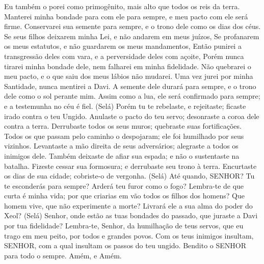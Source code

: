 {  Eu também o porei como primogênito, mais alto que todos os reis da terra.
  Manterei minha bondade para com ele para sempre, e meu pacto com ele será firme.
  Conservarei sua semente para sempre, e o trono dele como os dias dos céus.
  Se seus filhos deixarem minha Lei, e não andarem em meus juízos,
  Se profanarem os meus estatutos, e não guardarem os meus mandamentos,
  Então punirei a transgressão deles com vara, e a perversidade deles com açoite,
  Porém nunca tirarei minha bondade dele, nem falharei em minha fidelidade.
  Não quebrarei o meu pacto, e o que saiu dos meus lábios não mudarei.
  Uma vez jurei por minha Santidade,
{} nunca mentirei a Davi.
  A semente dele durará para sempre, e o trono dele
{} como o sol perante mim.
  Assim como a lua, ele será confirmado para sempre; e a testemunha no céu é fiel. (Selá)
  Porém tu te rebelaste, e
{} rejeitaste; ficaste irado contra o teu Ungido.
  Anulaste o pacto do teu servo; desonraste a coroa dele
{} contra a terra.
  Derrubaste todos os seus muros; quebraste suas fortificações.
  Todos os que passam pelo caminho o despojaram; ele foi humilhado por seus vizinhos.
  Levantaste a mão direita de seus adversários; alegraste a todos os inimigos dele.
  Também deixaste de afiar sua espada; e não o sustentaste na batalha.
  Fizeste cessar sua formosura; e derrubaste seu trono à terra.
  Encurtaste os dias de sua cidade; cobriste-o de vergonha. (Selá)
  Até quando, SENHOR? Tu te esconderás para sempre? Arderá teu furor como o fogo?
  Lembra-te de que curta é minha vida; por que criarias em vão todos os filhos dos homens?
  Que homem vive, que não experimente a morte? Livrará ele a sua alma do poder do Xeol?
 (Selá)
  Senhor, onde estão as tuas bondades do passado, que juraste a Davi por tua fidelidade?
  Lembra-te, Senhor, da humilhação de teus servos, que eu trago em meu peito,
{} por todos e grandes povos.
  Com
{} os teus inimigos insultam, SENHOR, com a qual insultam os passos do teu ungido.
  Bendito
{} o SENHOR para todo o sempre. Amém, e Amém.
\par }


